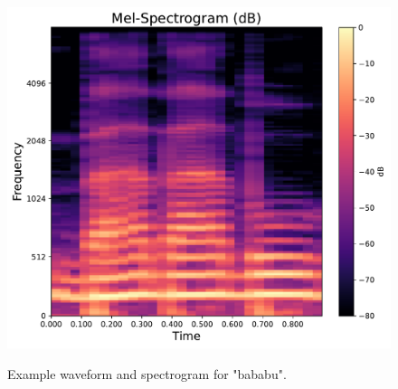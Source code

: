\begin{figure}[h]
\begin{minipage}[b]{0.3\linewidth}
			\label{fig:linear-spectrogram-db}
		\end{minipage}
	\hfill
	\begin{minipage}[b]{0.3\linewidth}
		\includegraphics[width=\linewidth]{"graphs/sectr_example/Mel-Spectrogram (dB)"}
		\label{fig:mel-spectrogram-db}
	\end{minipage}
	\caption{Example waveform and spectrogram for "bababu".}
	\label{fig:example_mel_bababu}
\end{figure}
